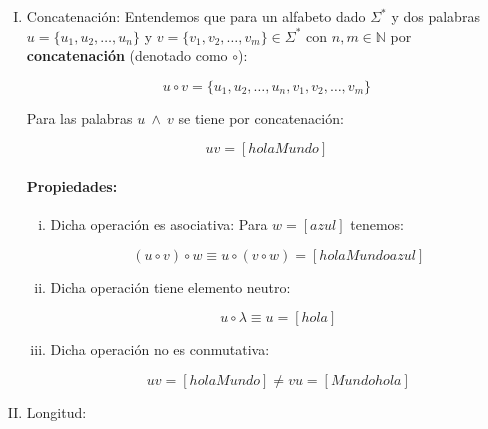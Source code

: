 \begin{enumerate}[I.]

\item {}Concatenación: Entendemos que para un alfabeto dado $\Sigma^*$ y dos 
palabras $u = \{u_1, u_2, \ldots, u_n\}$ y $v=\{v_1, v_2, \ldots, v_m\} \in 
\Sigma^*$ con $n,m \in \mathbb{N}$ por \textbf{concatenación} (denotado como 
$\circ$): {

\begin{equation}
u \circ v = \{u_1, u_2, \ldots, u_n, v_1, v_2, \ldots, v_m\} 
\end{equation}


\ejem Para las palabras $u\ \wedge\ v$ se tiene por
concatenación:

\begin{equation}
uv = [holaMundo]
\end{equation}

\paragraph*{Propiedades:}

\begin{enumerate}[i.]


\item Dicha operación es asociativa: Para $w = [azul]$ tenemos:

\begin{equation}
(u \circ v) \circ w \equiv  u \circ (v \circ w) = [holaMundoazul]
\end{equation}


\item Dicha operación tiene elemento neutro:

\begin{equation}
u  \circ \lambda \equiv u = [hola]
\end{equation}

\item Dicha operación no es conmutativa:

\begin{equation}
uv = [holaMundo] \neq vu = [Mundohola]
\end{equation}
 
\end{enumerate}


}
\item {}Longitud:{

}
\end{enumerate}
